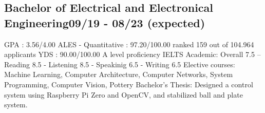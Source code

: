 \vspace*{10pt}
\subsection{{Bachelor of Electrical and Electronical Engineering}\hfill 09/19 - 08/23 (expected)}
\vspace*{5pt}
GPA : 3.56/4.00 \newline
ALES - Quantitative : 97.20/100.00 \hfill ranked 159 out of 104.964 applicants \newline
YDS : 90.00/100.00 \hfill A level proficiency \newline
IELTS Academic: Overall 7.5 -- Reading 8.5 - Listening 8.5 - Speakinig 6.5 - Writing 6.5 \newline
Elective courses: Machine Learning, Computer Architecture, Computer Networks, System Programming, Computer Vision, Pottery \newline
Bachelor's Thesis: Designed a control system using Raspberry Pi Zero and OpenCV, and stabilized ball and plate system.
